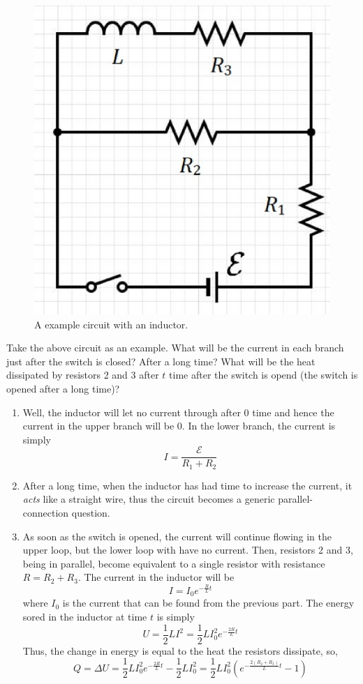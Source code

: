 \documentclass{scrartcl}
\begin{document}
    \begin{figure}[H]
        \centering
        \includegraphics[scale=.3]{example.eps}
        \caption{A example circuit with an inductor.}
    \end{figure}
    Take the above circuit as an example. What will be the current in each branch just after the switch is closed? After a long time? What will be the heat dissipated by resistors 2 and 3 after $t$ time after the switch is opend (the switch is opened after a long time)?
    \begin{enumerate}[label=(\alph*)]
        \item Well, the inductor will let no current through after 0 time and hence the current in the upper branch will be 0. In the lower branch, the current is simply \[I=\frac{\mathcal E}{R_1+R_2}\]
        \item After a long time, when the inductor has had time to increase the current, it \textit{acts} like a straight wire, thus the circuit becomes a generic parallel-connection question.
        \item As soon as the switch is opened, the current will continue flowing in the upper loop, but the lower loop with have no current. Then, resistors 2 and 3, being in parallel, become equivalent to a single resistor with resistance $R=R_2+R_3$. The current in the inductor will be \[I=I_0e^{-\frac RLt}\] where $I_0$ is the current that can be found from the previous part. The energy sored in the inductor at time $t$ is simply \[U=\frac12LI^2=\frac12LI_0^2e^{-\frac{2R}Lt}\] Thus, the change in energy is equal to the heat the resistors dissipate, so, \[Q=\Delta U=\frac12LI_0^2e^{-\frac{2R}Lt}-\frac12LI_0^2=\boxed{\frac12LI_0^2\left(e^{-\frac{2\left(R_2+R_3\right)}Lt}-1\right)}\]
    \end{enumerate}
\end{document}
